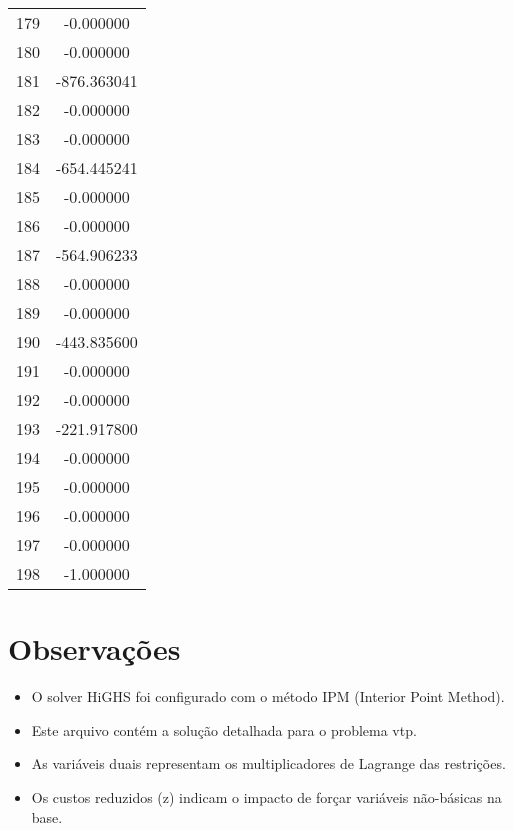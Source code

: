 \documentclass[12pt]{article}
\begin{document}
\begin{longtable}{@{}cc@{}}
179 & -0.000000 \\
180 & -0.000000 \\
181 & -876.363041 \\
182 & -0.000000 \\
183 & -0.000000 \\
184 & -654.445241 \\
185 & -0.000000 \\
186 & -0.000000 \\
187 & -564.906233 \\
188 & -0.000000 \\
189 & -0.000000 \\
190 & -443.835600 \\
191 & -0.000000 \\
192 & -0.000000 \\
193 & -221.917800 \\
194 & -0.000000 \\
195 & -0.000000 \\
196 & -0.000000 \\
197 & -0.000000 \\
198 & -1.000000 \\

\end{longtable}


\section{Observações}

\begin{itemize}
\item O solver HiGHS foi configurado com o método IPM (Interior Point Method).
\item Este arquivo contém a solução detalhada para o problema vtp.
\item As variáveis duais representam os multiplicadores de Lagrange das restrições.
\item Os custos reduzidos (z) indicam o impacto de forçar variáveis não-básicas na base.
\end{itemize}
\end{document}

